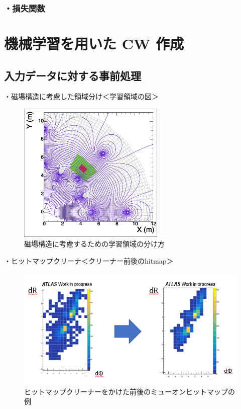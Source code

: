 \subsubsection{・損失関数}

\section{機械学習を用いた CW 作成}
\subsection{入力データに対する事前処理}
・磁場構造に考慮した領域分け＜学習領域の図＞\\
\begin{figure}[tb]
  \centering
  \includegraphics[clip, width=7cm]{fig/4/c1_withMag.pdf}
  \caption{磁場構造に考慮するための学習領域の分け方}
  \label{fig:Mag}
\end{figure}

・ヒットマップクリーナ＜クリーナー前後のhitmap＞
\begin{figure}[tb]
  \centering
  \includegraphics[clip, width=14cm]{fig/4/cleaner.png}
  \caption{ヒットマップクリーナーをかけた前後のミューオンヒットマップの例}
  \label{fig:hitmapcleaner}
\end{figure}


